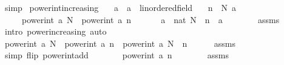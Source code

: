\begin{isabellebody}
\ simp\isanewline
{}\isamarkupfalse%
%
\endisatagproof
{\isafoldproof}%
%
\isadelimproof
\isanewline
%
\endisadelimproof
\isanewline
{}\isamarkupfalse%
\ power{\isacharunderscore}{\kern0pt}int{\isacharunderscore}{\kern0pt}increasing{\isacharcolon}{\kern0pt}\isanewline
\ \ \ a\ {\isacharcolon}{\kern0pt}{\isacharcolon}{\kern0pt}\ {\isachardoublequoteopen}{\isacharprime}{\kern0pt}a\ {\isacharcolon}{\kern0pt}{\isacharcolon}{\kern0pt}\ linordered{\isacharunderscore}{\kern0pt}field{\isachardoublequoteclose}\isanewline
\ \ \ {\isachardoublequoteopen}n\ {\isasymle}\ N{\isachardoublequoteclose}\ {\isachardoublequoteopen}a\ {\isasymge}\ {}{\isachardoublequoteclose}\isanewline
\ \ \ \ \ {\isachardoublequoteopen}power{\isacharunderscore}{\kern0pt}int\ a\ N\ {\isasymge}\ power{\isacharunderscore}{\kern0pt}int\ a\ n{\isachardoublequoteclose}\isanewline
%
\isadelimproof
%
\endisadelimproof
%
\isatagproof
{}\isamarkupfalse%
\ {\isacharminus}{\kern0pt}\isanewline
\ \ \isamarkupfalse%
\ {\isacharasterisk}{\kern0pt}{\isacharcolon}{\kern0pt}\ {\isachardoublequoteopen}a\ {\isacharcircum}{\kern0pt}\ nat\ {\isacharparenleft}{\kern0pt}N\ {\isacharminus}{\kern0pt}\ n{\isacharparenright}{\kern0pt}\ {\isasymge}\ a\ {\isacharcircum}{\kern0pt}\ {}{\isachardoublequoteclose}\isanewline
\ \ \ \ \isamarkupfalse%
\ assms\ \isamarkupfalse%
\ {\isacharparenleft}{\kern0pt}intro\ power{\isacharunderscore}{\kern0pt}increasing{\isacharparenright}{\kern0pt}\ auto\isanewline
\ \ \isamarkupfalse%
\ {\isachardoublequoteopen}power{\isacharunderscore}{\kern0pt}int\ a\ N\ {\isacharequal}{\kern0pt}\ power{\isacharunderscore}{\kern0pt}int\ a\ n\ {\isacharasterisk}{\kern0pt}\ power{\isacharunderscore}{\kern0pt}int\ a\ {\isacharparenleft}{\kern0pt}N\ {\isacharminus}{\kern0pt}\ n{\isacharparenright}{\kern0pt}{\isachardoublequoteclose}\isanewline
\ \ \ \ \isamarkupfalse%
\ assms\ \isamarkupfalse%
\ {\isacharparenleft}{\kern0pt}simp\ flip{\isacharcolon}{\kern0pt}\ power{\isacharunderscore}{\kern0pt}int{\isacharunderscore}{\kern0pt}add{\isacharparenright}{\kern0pt}\isanewline
\ \ \isamarkupfalse%
\ \isamarkupfalse%
\ {\isachardoublequoteopen}{\isasymdots}\ {\isasymge}\ power{\isacharunderscore}{\kern0pt}int\ a\ n\ {\isacharasterisk}{\kern0pt}\ {}{\isachardoublequoteclose}\isanewline
\ \ \ \ \isamarkupfalse%
\ assms\ {\isacharasterisk}{\kern0pt}\ \isamarkupfalse%

\end{isabellebody}
